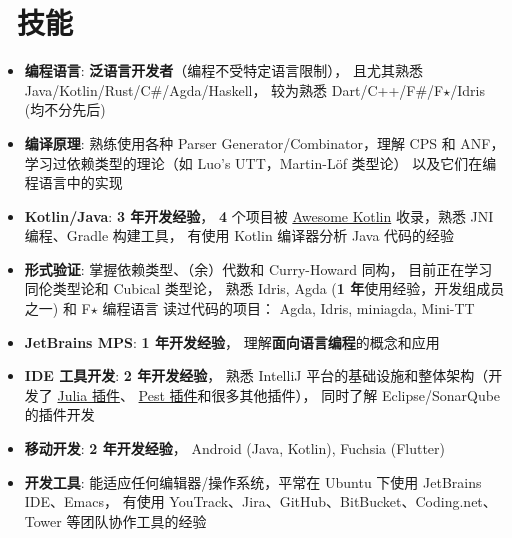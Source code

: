 \documentclass{resume}
\begin{document}


\section{\faCogs\ 技能}
\begin{itemize}[parsep=0.25ex]
  \item \textbf{编程语言}:
    \textbf{泛语言开发者}（编程不受特定语言限制），
    且尤其熟悉 Java/Kotlin/Rust/C\#/Agda/Haskell，
    较为熟悉 Dart/C++/F\#/F$\star$/Idris (均不分先后)

  \item \textbf{编译原理}:
    熟练使用各种 Parser Generator/Combinator，理解 CPS 和 ANF，
    学习过依赖类型的理论（如 Luo's UTT，Martin-L\"{o}f 类型论）
    以及它们在编程语言中的实现

  \item \textbf{Kotlin/Java}:
    \textbf{3 年开发经验}，
    \textbf{4} 个项目被
    \href{https://kotlin.link/?q=ice} {Awesome Kotlin}
    收录，熟悉 JNI 编程、Gradle 构建工具，
    有使用 Kotlin 编译器分析 Java 代码的经验

  \item \textbf{形式验证}:
    掌握依赖类型、（余）代数和 Curry-Howard 同构，
    目前正在学习同伦类型论和 Cubical 类型论，
    熟悉 Idris, Agda (\textbf{1 年}使用经验，开发组成员之一)
    和 F$\star$ 编程语言
    \subitem 读过代码的项目： Agda, Idris, miniagda, Mini-TT

  \item \textbf{JetBrains MPS}:
    \textbf{1 年开发经验}，
    理解\textbf{面向语言编程}的概念和应用

  \item \textbf{IDE 工具开发}:
    \textbf{2 年开发经验}，
    熟悉 IntelliJ 平台的基础设施和整体架构（开发了
      \href{https://plugins.jetbrains.com/plugin/10413-julia}
           {Julia 插件}、
      \href{https://plugins.jetbrains.com/plugin/12046-pest}
           {Pest 插件}和很多其他插件），
    同时了解 Eclipse/SonarQube 的插件开发

  \item \textbf{移动开发}:
    \textbf{2 年开发经验}，
    Android (Java, Kotlin), Fuchsia (Flutter)

  \item \textbf{开发工具}:
    能适应任何编辑器/操作系统，平常在 Ubuntu 下使用 JetBrains IDE、Emacs，
    有使用 YouTrack、Jira、GitHub、BitBucket、Coding.net、Tower 等团队协作工具的经验
\end{itemize}
\end{document}
